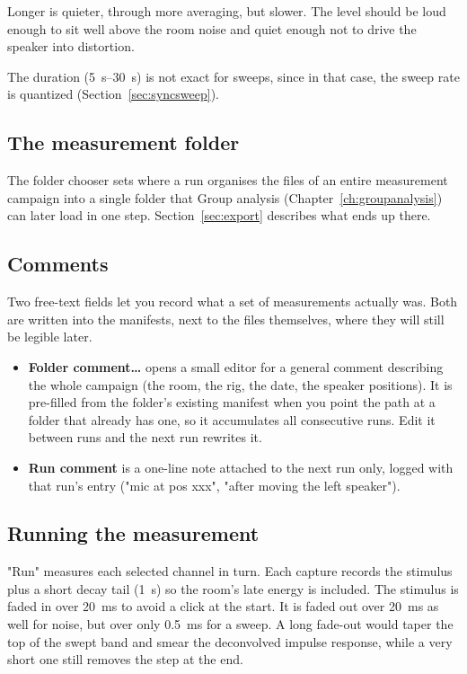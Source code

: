 Longer is quieter, through more averaging, but slower. The level should be loud enough to sit well above the room noise and quiet enough not to drive the speaker into distortion.

The duration (\SIrange{5}{30}{\second}) is not exact for sweeps, since in that case, the sweep rate is quantized (Section~\ref{sec:syncsweep}). 

\subsection{The measurement folder}
The folder chooser sets where a run organises the files of an entire measurement campaign into a single folder that Group analysis (Chapter~\ref{ch:groupanalysis}) can later load in one step. Section~\ref{sec:export} describes what ends up there.

\subsection{Comments}\label{sec:comments}
Two free-text fields let you record what a set of measurements actually was. Both are written into the manifests, next to the files themselves, where they will still be legible later.

\begin{itemize}[nosep]
  \item \textbf{Folder comment\ldots} opens a small editor for a general comment describing the whole campaign (the room, the rig, the date, the speaker positions). It is pre-filled from the folder's existing manifest when you point the path at a folder that already has one, so it accumulates all consecutive runs. Edit it between runs and the next run rewrites it.
  \item \textbf{Run comment} is a one-line note attached to the next run only, logged with that run's entry ("mic at pos xxx", "after moving the left speaker").
\end{itemize}

\subsection{Running the measurement}
"Run" measures each selected channel in turn. Each capture records the stimulus plus a short decay tail (\SI{1}{\second}) so the room's late energy is included. The stimulus is faded in over \SI{20}{\milli\second} to avoid a click at the start. It is faded out over \SI{20}{\milli\second} as well for noise, but over only \SI{0.5}{\milli\second} for a sweep. A long fade-out would taper the top of the swept band and smear the deconvolved impulse response, while a very short one still removes the step at the end.

